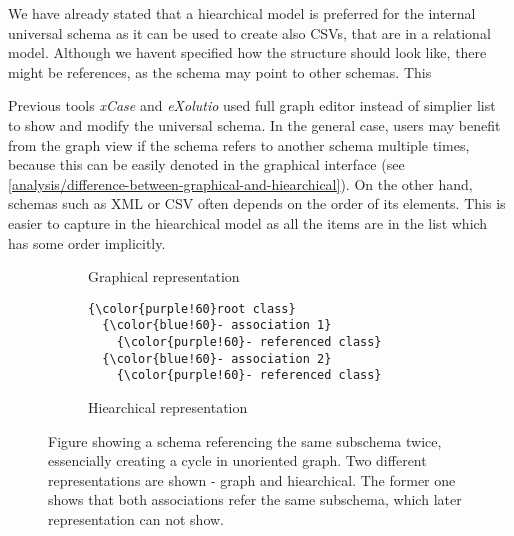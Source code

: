 We have already stated that a hiearchical model is preferred for the internal universal schema as it can be used to create also CSVs, that are in a relational model. Although we havent specified how the structure should look like, there might be references, as the schema may point to other schemas. This

Previous tools \textit{xCase} and \textit{eXolutio} used full graph editor instead of simplier list to show and modify the universal schema. In the general case, users may benefit from the graph view if the schema refers to another schema multiple times, because this can be easily denoted in the graphical interface (see \autoref{analysis/difference-between-graphical-and-hiearchical}). On the other hand, schemas such as XML or CSV often depends on the order of its elements. This is easier to capture in the hiearchical model as all the items are in the list which has some order implicitly.

\begin{figure}\centering
    \begin{subfigure}{.5\textwidth}
        \centering
        \caption{Graphical representation}
      \end{subfigure}%
      \begin{subfigure}{.5\textwidth}
\begin{Verbatim}[commandchars=\\\{\}]
{\color{purple!60}root class}
  {\color{blue!60}- association 1}
    {\color{purple!60}- referenced class}
  {\color{blue!60}- association 2}
    {\color{purple!60}- referenced class}
\end{Verbatim}
        \caption{Hiearchical representation}
      \end{subfigure}

    \caption{Figure showing a schema referencing the same subschema twice, essencially creating a cycle in unoriented graph. Two different representations are shown - graph and hiearchical.  The former one shows that both associations refer the same subschema, which later representation can not show.}
    \label{analysis/difference-between-graphical-and-hiearchical}
\end{figure}

